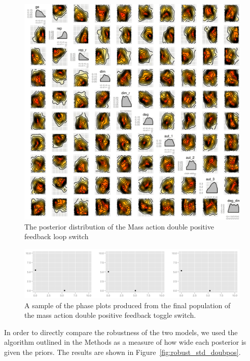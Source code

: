 \begin{figure}[p]
\centering
\includegraphics[scale=0.2]{chapterModelling/mass_action_switches/deterministic/posterior_ma_dp_bi.png}
\caption{The posterior distribution of the Mass action double positive feedback loop switch}
\label{fig:doub_pos}
\end{figure}

\begin{figure}[p]
\centering
\includegraphics[scale=0.3]{chapterModelling/mass_action_switches/deterministic/ma_dp_bi_phase_plot.png}
\caption{A sample of the phase plots produced from the final population of the mass action double positive feedback toggle switch.}
\label{fig:det_dp_phase}
\end{figure}

In order to directly compare the robustness of the two models, we used the algorithm outlined in the Methods as a measure of how wide each posterior is given the priors. The results are shown in Figure~\ref{fig:robust_std_doubpos}. 

